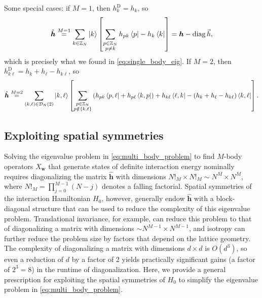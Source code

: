 \documentclass[nofootinbib,notitlepage,11pt]{revtex4-2}
\renewcommand{\t}{\text} %
\newcommand{\p}[1]{\left(#1\right)} %
\renewcommand{\sp}[1]{\left[#1\right]} %
\renewcommand{\set}[1]{\left\{#1\right\}} %
\newcommand{\m}{\bm} %
\renewcommand{\v}{\vec} %
\newcommand{\1}{\mathds{1}}
\newcommand{\D}{\mathcal{D}}
\newcommand{\ZZ}{\mathbb{Z}}
\DeclareMathOperator{\diag}{diag}
\begin{document}
Some special cases: if $M=1$, then $h^{\t{D}}_k=h_k$, so
\begin{align}
  \hat{\m h} \stackrel{M=1}{=} \sum_{k\in\ZZ_N} \ket{k}
  \sp{\sum_{\substack{p\in\ZZ_N\\p\ne k}} h_{pk} \bra{p} - h_k \bra{k}}
  = \m h - \diag\v h,
\end{align}
which is precisely what we found in \eqref{eq:single_body_eig}.  If
$M=2$, then $h_{k\ell}^{\t{D}}=h_k+h_\ell-h_{k\ell}$, so
\begin{align}
  \hat{\m h} \stackrel{M=2}{=}
  \sum_{\p{k,\ell}\in\D_N\p{2}} \ket{k,\ell}
  \sp{\sum_{\substack{p\in\ZZ_N\\p\notin\set{k,\ell}}}
    \p{ h_{pk} \bra{p,\ell} + h_{p\ell} \bra{k,p} }
    + h_{k\ell} \bra{\ell,k}
    - \p{h_k + h_\ell - h_{k\ell}} \bra{k,\ell}}.
\end{align}

\subsection{Exploiting spatial symmetries}
\label{sec:symmetries}

Solving the eigenvalue problem in \eqref{eq:multi_body_problem} to
find $M$-body operators $X_{\m w}$ that generate states of definite
interaction energy nominally requires diagonalizing the matrix
$\hat{\m h}$ with dimensions $N!_M\times N!_M\sim N^M\times N^M$,
where $N!_M=\prod_{j=0}^{M-1}\p{N-j}$ denotes a falling factorial.
Spatial symmetries of the interaction Hamiltonian $H_0$, however,
generally endow $\hat{\m h}$ with a block-diagonal structure that can
be used to reduce the complexity of this eigenvalue problem.
Translational invariance, for example, can reduce this problem to that
of diagonalizing a matrix with dimensions
$\sim N^{M-1}\times N^{M-1}$, and isotropy can further reduce the
problem size by factors that depend on the lattice geometry.  The
complexity of diagonalizing a matrix with dimensions $d\times d$ is
$O\p{d^3}$, so even a reduction of $d$ by a factor of 2 yields
practically significant gains (a factor of $2^3=8$) in the runtime of
diagonalization.  Here, we provide a general prescription for
exploiting the spatial symmetries of $H_0$ to simplify the eigenvalue
problem in \eqref{eq:multi_body_problem}.
\end{document}
